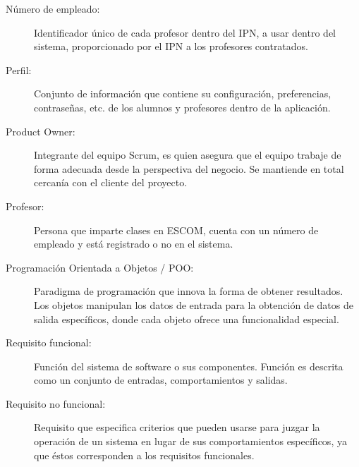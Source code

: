\begin{description}
	\item[Número de empleado:] Identificador único de cada profesor dentro del IPN, a usar dentro del sistema, proporcionado por el IPN a los profesores contratados.

	\item[Perfil:] Conjunto de información que contiene su configuración, preferencias, contraseñas, etc. de los alumnos y profesores dentro de la aplicación.
	\item[Product Owner:] Integrante del equipo Scrum, es quien asegura que el equipo trabaje de forma adecuada desde la perspectiva del negocio. Se mantiende en total cercanía con el cliente del proyecto.
	\item[Profesor:] Persona que imparte clases en ESCOM, cuenta con un número de empleado y está registrado o no en el sistema.
	\item[Programación Orientada a Objetos / POO:] Paradigma de programación que innova la forma de obtener resultados. Los objetos manipulan los datos de entrada para la obtención de datos de salida específicos, donde cada objeto ofrece una funcionalidad especial.

	\item[Requisito funcional:] Función del sistema de software o sus componentes. Función es descrita como un conjunto de entradas, comportamientos y salidas.
	\item[Requisito no funcional:] Requisito que especifica criterios que pueden usarse para juzgar la operación de un sistema en lugar de sus comportamientos específicos, ya que éstos corresponden a los requisitos funcionales. 


\end{description}
